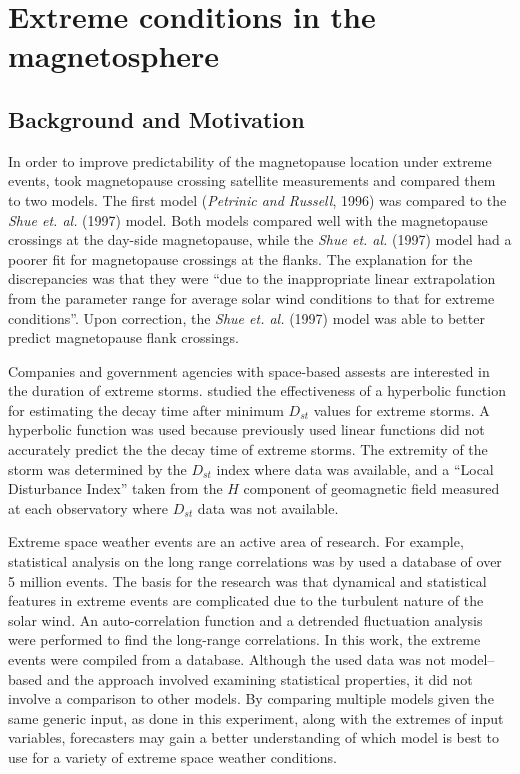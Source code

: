 \section[Extreme Conditions]{Extreme conditions in the magnetosphere}

\subsection{Background and Motivation}
In order to improve predictability of the magnetopause location under extreme
events, \citet{Shue1998} took magnetopause crossing satellite measurements and
compared them to two models. The first model (\textit{Petrinic and Russell},
1996) was compared to the \textit{Shue et. al.} (1997) model. Both models
compared well with the magnetopause crossings at the day-side magnetopause,
while the \textit{Shue et. al.} (1997) model had a poorer fit for magnetopause
crossings at the flanks.
The explanation for the discrepancies was that they were ``due to the inappropriate linear extrapolation from the parameter range for average solar wind conditions to that
for extreme conditions''. Upon correction, the \textit{Shue et. al.}
(1997) model was able to better predict magnetopause flank crossings.

Companies and government agencies with space-based assests are interested in the
duration of extreme storms. \citet{Cid2013} studied the effectiveness of a
hyperbolic function for estimating the decay time after minimum $D_{st}$ values
for extreme storms.
A hyperbolic function was used because previously used linear functions did not
accurately predict the the decay time of extreme storms. The extremity of the
storm was determined by the $D_{st}$ index where data was available, and a
``Local Disturbance Index'' taken from the $H$ component of geomagnetic field
measured at each observatory where $D_{st}$ data was not available.

Extreme space weather events are an active area of research.  For
example, statistical analysis on the long range correlations was by
\citet{Sharma2011} used a database of over 5 million events. The basis
for the research was that dynamical and statistical features in
extreme events are complicated due to the turbulent nature of the
solar wind.  An auto-correlation function and a detrended fluctuation
analysis were performed to find the long-range correlations.  In this
work, the extreme events were compiled from a
database. Although the used data was not model--based and the approach involved examining statistical properties, it did not involve a comparison to other models.
By comparing multiple models given the same generic input, as done in this experiment, along
with the extremes of input variables, forecasters may gain a better
understanding of which model is best to use for a variety of extreme
space weather conditions.

